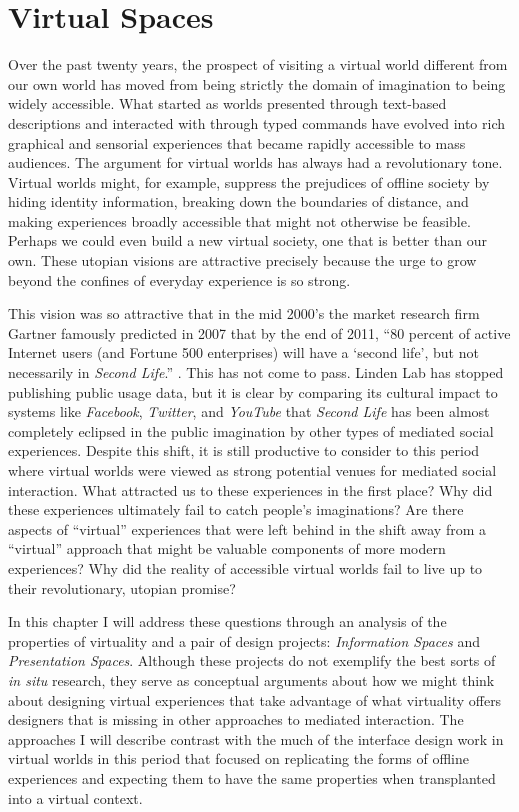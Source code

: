 \chapter{Virtual Spaces}
\label{ch:virtual}

Over the past twenty years, the prospect of visiting a virtual world different from our own world has moved from being strictly the domain of imagination to being widely accessible. What started as worlds presented through text-based descriptions and interacted with through typed commands have evolved into rich graphical and sensorial experiences that became rapidly accessible to mass audiences. The argument for virtual worlds has always had a revolutionary tone. Virtual worlds might, for example, suppress the prejudices of offline society by hiding identity information, breaking down the boundaries of distance, and making experiences broadly accessible that might not otherwise be feasible. Perhaps we could even build a new virtual society, one that is better than our own. These utopian visions are attractive precisely because the urge to grow beyond the confines of everyday experience is so strong.

This vision was so attractive that in the mid 2000's the market research firm Gartner famously predicted in 2007 that by the end of 2011, ``80 percent of active Internet users (and Fortune 500 enterprises) will have a `second life', but not necessarily in \emph{Second Life}.'' \citep{Anonymous:2007wz}. This has not come to pass. Linden Lab has stopped publishing public usage data, but it is clear by comparing its cultural impact to systems like \emph{Facebook}, \emph{Twitter}, and \emph{YouTube} that \emph{Second Life} has been almost completely eclipsed in the public imagination by other types of mediated social experiences. Despite this shift, it is still productive to consider to this period where virtual worlds were viewed as strong potential venues for mediated social interaction. What attracted us to these experiences in the first place? Why did these experiences ultimately fail to catch people's imaginations? Are there aspects of ``virtual'' experiences that were left behind in the shift away from a ``virtual'' approach that might be valuable components of more modern experiences? Why did the reality of accessible virtual worlds fail to live up to their revolutionary, utopian promise?

In this chapter I will address these questions through an analysis of the properties of virtuality and a pair of design projects: \emph{Information Spaces} and \emph{Presentation Spaces}. Although these projects do not exemplify the best sorts of \emph{in situ} research, they serve as conceptual arguments about how we might think about designing virtual experiences that take advantage of what virtuality offers designers that is missing in other approaches to mediated interaction. The approaches I will describe contrast with the much of the interface design work in virtual worlds in this period that focused on replicating the forms of offline experiences and expecting them to have the same properties when transplanted into a virtual context.

